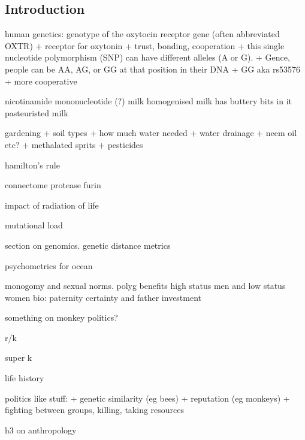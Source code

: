 
\subsection{Introduction}

human genetics: genotype of the oxytocin receptor gene (often abbreviated OXTR)
+ receptor for oxytonin
  + trust, bonding, cooperation
  + this single nucleotide polymorphism (SNP) can have different alleles (A or G).
  + Gence, people can be AA, AG, or GG at that position in their DNA
+ GG aka rs53576
  + more cooperative


nicotinamide mononucleotide (?)
milk
	homogenised milk
		has buttery bits in it
	pasteuristed milk


gardening
+ soil types
+ how much water needed
+ water drainage
+ neem oil etc?
+ methalated sprits
+ pesticides

hamilton's rule

connectome
protease
furin

impact of radiation of life

mutational load

section on genomics. genetic distance metrics

psychometrics for ocean

monogomy and sexual norms. polyg benefits high status men and low status women
bio: paternity certainty and father investment

something on monkey politics?

r/k

super k

life history

politics like stuff:
+ genetic similarity (eg bees)
+ reputation (eg monkeys)
+ fighting between groups, killing, taking resources

h3 on anthropology



